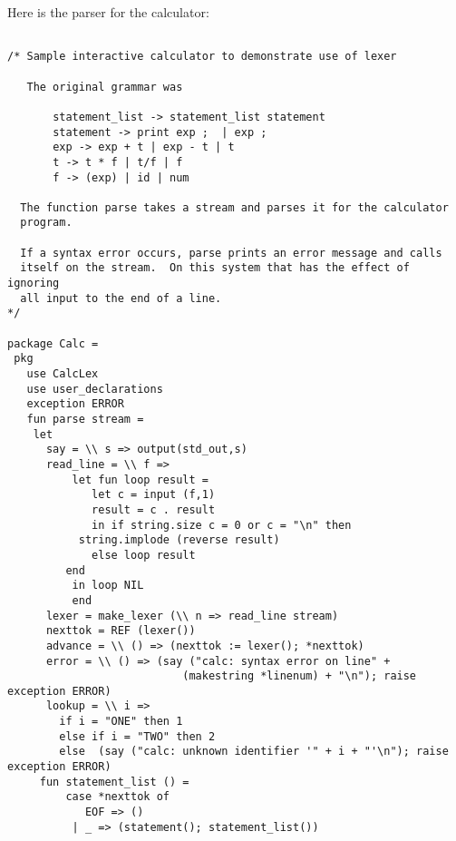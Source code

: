 Here is the parser for the calculator:
\begin{verbatim}

/* Sample interactive calculator to demonstrate use of lexer 
 
   The original grammar was

       statement_list -> statement_list statement
       statement -> print exp ;  | exp ;
       exp -> exp + t | exp - t | t
       t -> t * f | t/f | f
       f -> (exp) | id | num

  The function parse takes a stream and parses it for the calculator 
  program.

  If a syntax error occurs, parse prints an error message and calls
  itself on the stream.  On this system that has the effect of ignoring
  all input to the end of a line.  
*/
       
package Calc =
 pkg
   use CalcLex
   use user_declarations
   exception ERROR
   fun parse stream =
    let
      say = \\ s => output(std_out,s)
      read_line = \\ f =>
          let fun loop result =
             let c = input (f,1)
	         result = c . result
             in if string.size c = 0 or c = "\n" then
	  	   string.implode (reverse result)
	         else loop result
	     end
          in loop NIL
          end
      lexer = make_lexer (\\ n => read_line stream)
      nexttok = REF (lexer())
      advance = \\ () => (nexttok := lexer(); *nexttok)
      error = \\ () => (say ("calc: syntax error on line" +
                           (makestring *linenum) + "\n"); raise exception ERROR)
      lookup = \\ i =>
        if i = "ONE" then 1
        else if i = "TWO" then 2
        else  (say ("calc: unknown identifier '" + i + "'\n"); raise exception ERROR)
     fun statement_list () =
         case *nexttok of
            EOF => ()
          | _ => (statement(); statement_list())
        

\end{verbatim}

